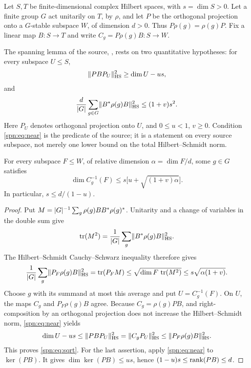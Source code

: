Let $S,T$ be finite-dimensional complex Hilbert spaces, with $s=\dim S>0$. Let a
finite group $G$ act unitarily on $T$, by $\rho$, and let $P$ be the orthogonal
projection onto a $G$-stable subspace $W$, of dimension $d>0$. Thus
$P\rho(g)=\rho(g)P$. Fix a linear map $B\colon S\to T$ and write
$C_g=P\rho(g)B\colon S\to W$.

The spanning lemma of the source, , rests on
two quantitative hypotheses: for every subspace $U\le S$,
\begin{equation}\label{spn:eq:near}
 \lVert PBP_U\rVert_{\mathrm{HS}}^2\ge \dim U-us,
\end{equation}
and
\begin{equation}\label{spn:eq:moment}
 \frac d{\lvert G\rvert}\sum_{g\in G}\lVert B^*\rho(g)B\rVert_{\mathrm{HS}}^2\le(1+v)s^2 .
\end{equation}
Here $P_U$ denotes orthogonal projection onto $U$, and $0\le u<1$, $v\ge0$.
Condition \eqref{spn:eq:near} is the predicate  of the
source; it is a statement on every source subspace, not merely one lower
bound on the total Hilbert--Schmidt norm.

\begin{lemma}\label{spn:lem:sqrt}
For every subspace $F\le W$, of relative dimension $\alpha=\dim F/d$, some
$g\in G$ satisfies
\begin{equation}\label{spn:eq:sqrt}
 \dim C_g^{-1}(F)\le s\bigl[u+\sqrt{(1+v)\alpha}\bigr].
\end{equation}
In particular, $s\le d/(1-u)$.
\end{lemma}

\begin{proof}
Put $M=\lvert G\rvert^{-1}\sum_g\rho(g)BB^*\rho(g)^*$. Unitarity and a change of
variables in the double sum give
\[
 \operatorname{tr}(M^2)=\frac1{\lvert G\rvert}\sum_g\lVert B^*\rho(g)B\rVert_{\mathrm{HS}}^2 .
\]
The Hilbert--Schmidt Cauchy--Schwarz inequality therefore gives
\[
 \frac1{\lvert G\rvert}\sum_g\lVert P_F\rho(g)B\rVert_{\mathrm{HS}}^2=\operatorname{tr}(P_FM)
 \le\sqrt{\dim F\,\operatorname{tr}(M^2)}\le s\sqrt{\alpha(1+v)} .
\]
Choose $g$ with its summand at most this average and put $U=C_g^{-1}(F)$. On
$U$, the maps $C_g$ and $P_F\rho(g)B$ agree. Because $C_g=\rho(g)PB$, and
right-composition by an orthogonal projection does not increase the
Hilbert--Schmidt norm, \eqref{spn:eq:near} yields
\[
 \dim U-us\le\lVert PBP_U\rVert_{\mathrm{HS}}^2=\lVert C_gP_U\rVert_{\mathrm{HS}}^2
 \le\lVert P_F\rho(g)B\rVert_{\mathrm{HS}}^2 .
\]
This proves \eqref{spn:eq:sqrt}. For the last assertion, apply
\eqref{spn:eq:near} to $\ker(PB)$. It gives $\dim\ker(PB)\le us$, hence
$(1-u)s\le\operatorname{rank}(PB)\le d$.
\end{proof}

